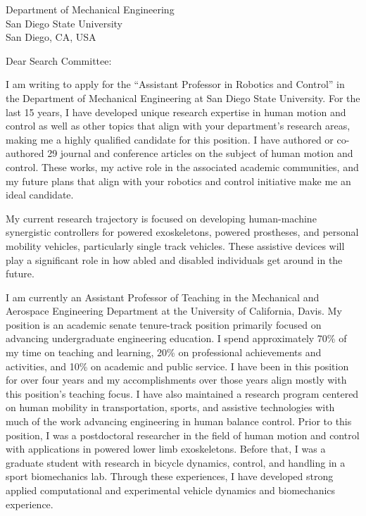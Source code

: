 \documentclass{letter}
\date{}
\begin{document}
\begin{letter}{
  Department of Mechanical Engineering \\
  San Diego State University \\
  San Diego, CA, USA
}

\opening{Dear Search Committee:}

I am writing to apply for the ``Assistant Professor in Robotics and Control''
in the Department of Mechanical Engineering at San Diego State University. For
the last 15 years, I have developed unique research expertise in human motion
and control as well as other topics that align with your department's research
areas, making me a highly qualified candidate for this position. I have
authored or co-authored 29 journal and conference articles on the subject of
human motion and control. These works, my active role in the associated
academic communities, and my future plans that align with your robotics and
control initiative make me an ideal candidate.

My current research trajectory is focused on developing human-machine
synergistic controllers for powered exoskeletons, powered prostheses, and
personal mobility vehicles, particularly single track vehicles. These assistive
devices will play a significant role in how abled and disabled individuals get
around in the future.

I am currently an Assistant Professor of Teaching in the Mechanical and
Aerospace Engineering Department at the University of California, Davis. My
position is an academic senate tenure-track position primarily focused on
advancing undergraduate engineering education. I spend approximately 70\% of my
time on teaching and learning, 20\% on professional achievements and
activities, and 10\% on academic and public service. I have been in this
position for over four years and my accomplishments over those years align
mostly with this position's teaching focus. I have also maintained a research
program centered on human mobility in transportation, sports, and assistive
technologies with much of the work advancing engineering in human balance
control. Prior to this position, I was a postdoctoral researcher in the field
of human motion and control with applications in powered lower limb
exoskeletons. Before that, I was a graduate student with research in bicycle
dynamics, control, and handling in a sport biomechanics lab. Through these
experiences, I have developed strong applied computational and experimental
vehicle dynamics and biomechanics experience.


\end{letter}
\end{document}
